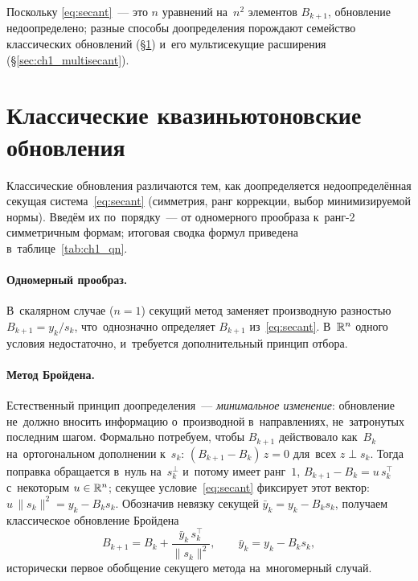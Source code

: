Поскольку
\eqref{eq:secant}~--- это $n$ уравнений на~$n^2$ элементов $B_{k+1}$,
обновление недоопределено; разные способы доопределения порождают
семейство классических обновлений (\S\ref{sec:ch1_classical}) и~его
мультисекущие расширения (\S\ref{sec:ch1_multisecant}).
\section{Классические квазиньютоновские обновления}\label{sec:ch1_classical}

Классические обновления различаются тем, как доопределяется
недоопределённая секущая система~\eqref{eq:secant} (симметрия, ранг
коррекции, выбор минимизируемой нормы). Введём их по~порядку~--- от
одномерного прообраза к~ранг-2 симметричным формам; итоговая сводка
формул приведена в~таблице~\ref{tab:ch1_qn}.

\paragraph{Одномерный прообраз.}
В~скалярном случае ($n=1$) секущий метод заменяет производную разностью
$B_{k+1}=y_k/s_k$, что~однозначно определяет $B_{k+1}$
из~\eqref{eq:secant}. В~$\mathbb{R}^n$ одного условия недостаточно, и~требуется
дополнительный принцип отбора.

\paragraph{Метод Бройдена.}
Естественный принцип доопределения~--- \emph{минимальное изменение}:
обновление не~должно вносить информацию о~производной в~направлениях,
не~затронутых последним шагом. Формально потребуем, чтобы $B_{k+1}$
действовало как~$B_k$ на~ортогональном дополнении к~$s_k$:
$(B_{k+1}-B_k)\,z = 0$ для~всех $z\perp s_k$. Тогда поправка обращается
в~нуль на~$s_k^\perp$ и~потому имеет ранг~$1$,
$B_{k+1}-B_k = u\,s_k^\top$ с~некоторым $u\in\mathbb{R}^n$; секущее
условие~\eqref{eq:secant} фиксирует этот вектор:
$u\,\|s_k\|^2 = y_k - B_k s_k$. Обозначив невязку секущей
$\bar y_k = y_k - B_k s_k$, получаем классическое обновление
Бройдена~\cite{broyden1965}
\begin{equation}\label{eq:ch1_broyden}
  B_{k+1} = B_k + \frac{\bar y_k\, s_k^\top}{\|s_k\|^2},
  \qquad \bar y_k = y_k - B_k s_k,
\end{equation}
исторически первое обобщение секущего метода на~многомерный случай.

